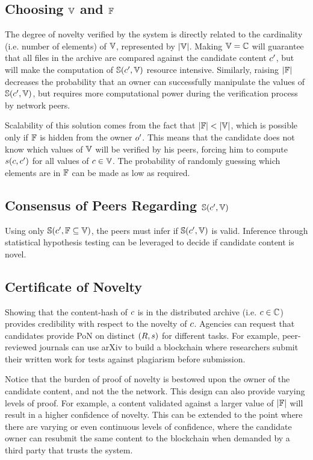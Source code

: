 \documentclass[conference]{IEEEtran}
\begin{document}
\subsection{Choosing ${\mathbb{V}}$ and ${\mathbb{F}}$}
The degree of novelty verified by the system is directly related to the cardinality (i.e. number of elements) of ${\mathbb{V}}$, represented by $\vert{\mathbb{V}}\vert$. Making ${\mathbb{V}} = {{\mathbb{C}}}$ will guarantee that all files in the archive are compared against the candidate content ${c}^\prime$, but will make the computation of ${\mathbb{S}}({c}^\prime, {\mathbb{V}})$ resource intensive. Similarly, raising $\vert{\mathbb{F}}\vert$ decreases the probability that an owner can successfully manipulate the values of ${\mathbb{S}}({c}^\prime, {\mathbb{V}})$, but requires more computational power during the verification process by network peers.

Scalability of this solution comes from the fact that $\vert{\mathbb{F}}\vert < \vert{\mathbb{V}}\vert$, which is possible only if ${\mathbb{F}}$ is hidden from the owner ${o}^\prime$. This means that the candidate does not know which values of ${\mathbb{V}}$ will be verified by his peers, forcing him to compute ${s}({c},{c}^\prime)$ for all values of ${c} \in {\mathbb{V}}$. The probability of randomly guessing which elements are in ${\mathbb{F}}$ can be made as low as required.

\subsection{Consensus of Peers Regarding ${\mathbb{S}}({c}^\prime, {\mathbb{V}})$}
Using only ${\mathbb{S}}({c}^\prime, {\mathbb{F}} \subseteq {\mathbb{V}})$, the peers must infer if ${\mathbb{S}}({c}^\prime, {\mathbb{V}})$ is valid. Inference through statistical hypothesis testing \cite{newey1994large} can be leveraged to decide if candidate content is novel.

\subsection{Certificate of Novelty}
Showing that the content-hash of ${c}$ is in the distributed archive (i.e. ${c} \in {{\mathbb{C}}}$) provides credibility with respect to the novelty of ${c}$. Agencies can request that candidates provide PoN on distinct $(R, {s})$ for different tasks. For example, peer-reviewed journals can use arXiv to build a blockchain where researchers submit their written work for tests against plagiarism before submission.

Notice that the burden of proof of novelty is bestowed upon the owner of the candidate content, and not the the network. This design can also provide varying levels of proof. For example, a content validated against a larger value of $\vert{\mathbb{F}}\vert$ will result in a higher confidence of novelty. This can be extended to the point where there are varying or even continuous levels of confidence, where the candidate owner can resubmit the same content to the blockchain when demanded by a third party that trusts the system.
\end{document}
